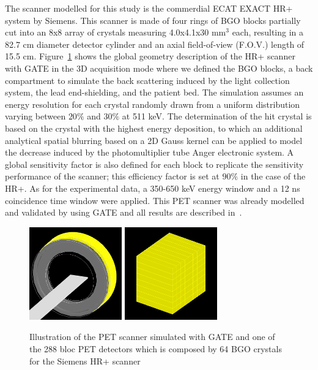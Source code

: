 \documentclass[11pt]{iopart}
\begin{document}
The scanner modelled for this study is the commerdial ECAT EXACT HR+~\cite{Brix1997} system by Siemens. This  scanner  is made of four rings of BGO blocks partially cut into an 8x8 array of crystals measuring 4.0x4.1x30 mm$^3$ each, resulting in a 82.7 cm diameter detector cylinder and an  axial field-of-view (F.O.V.) length of 15.5 cm. Figure~\ref{fig:fig0} shows the global geometry description of the HR+ scanner with GATE in the 3D acquisition mode where we defined the BGO blocks, a back compartment to simulate the back scattering induced by the light collection system, the lead end-shielding, and the patient bed. The simulation assumes an energy resolution for each crystal randomly drawn from a uniform distribution varying between $20 \%$ and $30 \%$ at 511 keV. The determination of the hit crystal is based on the crystal with the highest energy deposition, to which an additional analytical spatial blurring based on a 2D Gauss kernel can be applied to model the decrease induced by the photomultiplier tube Anger electronic system. A global sensitivity factor is also defined for each block to replicate the sensitivity performance of the scanner; this efficiency factor is set at $90 \%$ in the case of the HR+. As for the experimental data, a 350-650 keV energy window and a 12 ns coincidence time window were applied. This PET scanner was already modelled and validated by using GATE and all results are described in~\cite{Jan2005}.


\begin{figure}[!h]
\centering
\includegraphics[width=40mm,height=40mm]{figures/HR_Simu_Gate_GC.jpg}
\includegraphics[width=40mm,height=40mm]{figures/bloc_detec_HR.jpg}
\caption{Illustration of the PET scanner simulated with GATE and one of the 288 bloc PET detectors which is composed by 64 BGO crystals for the Siemens HR+
scanner}
\label{fig:fig0}
\end{figure}
\end{document}
